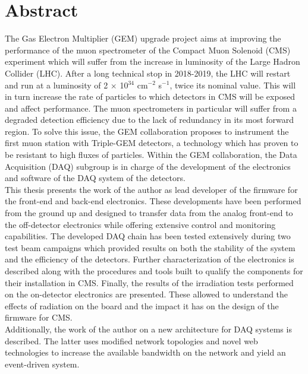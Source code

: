 \chapter*{Abstract}

  The Gas Electron Multiplier (GEM) upgrade project aims at improving the performance of the muon spectrometer of the Compact Muon Solenoid (CMS) experiment which will suffer from the increase in luminosity of the Large Hadron Collider (LHC). After a long technical stop in 2018-2019, the LHC will restart and run at a luminosity of 2 $\times$ 10$^{34}$ cm$^{-2}$ s$^{-1}$, twice its nominal value. This will in turn increase the rate of particles to which detectors in CMS will be exposed and affect performance. The muon spectrometers in particular will suffer from a degraded detection efficiency due to the lack of redundancy in its most forward region. To solve this issue, the GEM collaboration proposes to instrument the first muon station with Triple-GEM detectors, a technology which has proven to be resistant to high fluxes of particles. Within the GEM collaboration, the Data Acquisition (DAQ) subgroup is in charge of the development of the electronics and software of the DAQ system of the detectors. \\

  This thesis presents the work of the author as lead developer of the firmware for the front-end and back-end electronics. These developments have been performed from the ground up and designed to transfer data from the analog front-end to the off-detector electronics while offering extensive control and monitoring capabilities. The developed DAQ chain has been tested extensively during two test beam campaigns which provided results on both the stability of the system and the efficiency of the detectors. Further characterization of the electronics is described along with the procedures and tools built to qualify the components for their installation in CMS. Finally, the results of the irradiation tests performed on the on-detector electronics are presented. These allowed to understand the effects of radiation on the board and the impact it has on the design of the firmware for CMS. \\

  Additionally, the work of the author on a new architecture for DAQ systems is described. The latter uses modified network topologies and novel web technologies to increase the available bandwidth on the network and yield an event-driven system.
